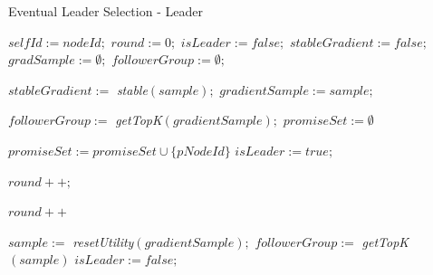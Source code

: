 \documentclass[12pt,a4paper,twoside,openright]{book}
\begin{document}
\begin{algorithm}[h]
\caption{Eventual Leader Selection - Leader} 
\label{leader}
\begin{algorithmic}[1]
  \State $selfId := nodeId;$ $round := 0;$
  \State $isLeader := false;$ $stableGradient := false;$
  \State $gradSample := \emptyset;$ $followerGroup := \emptyset;$
  \TriggerS[periodicCheck]{}\EndTriggerS
 \EndUpon

  \State $stableGradient := $ \emph{stable}$(sample);$
  \State $gradientSample := sample;$
 \EndUpon

\UponS[periodicCheck]{}
     \State $followerGroup := $ \emph{getTopK}$(gradientSample);$
        \EndTrigger
    \EndForEach
    \TriggerS[roundTimeout]{} \EndTriggerS
    \State $promiseSet := \emptyset$
  \EndIf
 \EndUponS

    \State $promiseSet := promiseSet \cup \{pNodeId\}$
        \EndTrigger 
      \EndForEach
      \State $isLeader := true;$
      \TriggerS[leaseTimeout]{}\EndTriggerS
      \TriggerS[cancelRoundTimeout]{}\EndTriggerS
    \EndIf
  \EndIf
\EndUpon

    \State $round++;$
    \TriggerS[cancelRoundTimeout]{}\EndTriggerS
  \EndIf
\EndUpon

\UponS[roundTimeout]{}
  \State $round++$
\EndUponS

\UponS[leaseTimeout]{} 
  \State $sample := $ \emph{resetUtility}$(gradientSample);$
    \State $followerGroup := $ \emph{getTopK}$(sample)$
       \EndTrigger
    \EndForEach
    \TriggerS[leaseTimeout]{}\EndTriggerS
  \Else
    \State $isLeader := false;$
  \EndIf
\EndUponS

\end{algorithmic}
\end{algorithm}
\end{document}
